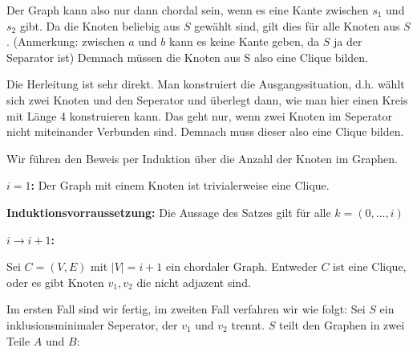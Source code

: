 Der Graph kann also nur dann chordal sein, wenn es eine Kante zwischen $s_1$ und $s_2$ gibt. Da die Knoten beliebig aus $S$ gewählt sind, gilt dies für alle Knoten aus $S$.
(Anmerkung: zwischen $a$ und $b$ kann es keine Kante geben, da $S$ ja der Separator ist)
Demnach müssen die Knoten aus S also eine Clique bilden.

\how

Die Herleitung ist sehr direkt. Man konstruiert die Ausgangssituation, d.h. wählt sich zwei Knoten und den Seperator und überlegt dann, wie man hier einen Kreis mit Länge 4 konstruieren kann.
Das geht nur, wenn zwei Knoten im Seperator nicht miteinander Verbunden sind. Demnach muss dieser also eine Clique bilden.

\subexercise

Wir führen den Beweis per Induktion über die Anzahl der Knoten im Graphen.

\textbf{$i = 1$:}
Der Graph mit einem Knoten ist trivialerweise eine Clique.

\textbf{Induktionsvorraussetzung:}
Die Aussage des Satzes gilt für alle $k = (0, \dots, i)$

\textbf{$i \rightarrow i + 1$:}

Sei $C = (V,E)$ mit $|V| = i + 1$ ein chordaler Graph.
Entweder $C$ ist eine Clique, oder es gibt Knoten $v_1, v_2$ die nicht adjazent sind.

Im ersten Fall sind wir fertig, im zweiten Fall verfahren wir wie folgt:
Sei $S$ ein inklusionsminimaler Seperator, der $v_1$ und $v_2$ trennt.
$S$ teilt den Graphen in zwei Teile $A$ und $B$:


